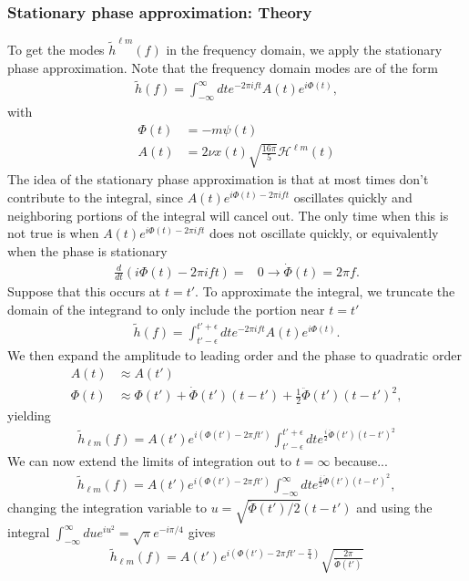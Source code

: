 \documentclass[aps,prd,amsmath,showpacs,amssymb,superscriptaddress,nofootinbib,longbibliography,eqsecnum,preprintnumbers]{revtex4-1}
\begin{document}
\subsubsection{Stationary phase approximation: Theory}
To get the modes $\tilde h^{\ell m}(f)$ in the frequency domain, we apply the stationary phase approximation. Note that the frequency domain modes are of the form
\begin{align}
\tilde h(f)=\int_{-\infty}^\infty dt e^{-2\pi i ft}A(t)e^{i\Phi(t)},
\end{align}
with
\begin{align}
\Phi(t)&=-m\psi(t)
\nonumber \\
A(t)&=2\nu x(t)\sqrt{\frac{16\pi}{5}}\mathcal{H}^{\ell m}(t)
\end{align}
The idea of the stationary phase approximation is that at most times don't contribute to the integral, since $A(t)e^{i\Phi(t)-2\pi i f t}$ oscillates quickly and neighboring portions of the integral will cancel out. The only time when this is not true is when $A(t)e^{i\Phi(t)-2\pi i f t}$ does not oscillate quickly, or equivalently when the phase is stationary
\begin{align}
\frac{d}{dt}\left(i\Phi(t)-2\pi i f t\right) =&0
\to \dot \Phi (t) =2\pi f.
\end{align}
Suppose that this occurs at $t=t'$. To approximate the integral, we truncate the domain of the integrand to only include the portion near $t=t'$ 
\begin{align}
\tilde h(f)=\int_{t' -\epsilon}^{t' +\epsilon} dt e^{-2\pi i ft}A(t)e^{i\Phi(t)}.
\end{align}
We then expand the amplitude to leading order and the phase to quadratic order
\begin{align}
A(t) &\approx A(t') \nonumber \\
\Phi(t)&\approx \Phi(t')+\dot \Phi(t')(t-t')+\frac{1}{2}\ddot \Phi(t')(t-t')^2,
\end{align}
yielding
\begin{align}
\tilde h_{\ell m}(f)=A(t')e^{i(\Phi(t')-2\pi ft')}\int_{t' -\epsilon}^{t' +\epsilon}
dt e^{\frac{i}{2}\ddot \Phi(t')(t-t')^2}
\end{align}
We can now extend the limits of integration out to $t=\infty$ because...
\begin{align}
\tilde h_{\ell m}(f)=A(t')e^{i(\Phi(t')-2\pi ft')}\int_{-\infty}^{\infty}
dt e^{\frac{i}{2}\ddot \Phi(t')(t-t')^2},
\end{align}
changing the integration variable to $u=\sqrt{\ddot \Phi(t')/2}(t-t')$ and using the integral $\int_{-\infty}^\infty du e^{iu^2}=\sqrt{\pi}e^{-i\pi/4}$ gives
\begin{align}
\tilde h_{\ell m} (f)=A(t')e^{i(\Phi(t')-2\pi ft' -\frac{\pi}{4})}\sqrt{\frac{2\pi}{\ddot \Phi(t')}} \label{eq:SPA}
\end{align}
\end{document}
